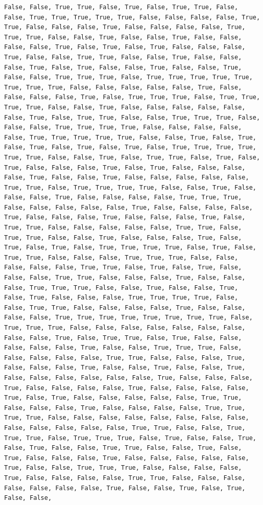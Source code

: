 \documentclass[
  letterpaper,
  DIV=11,
  numbers=noendperiod]{scrartcl}
\begin{document}
\begin{verbatim}
False, False, True, True, False, True, False, True, True, False, False, True, True, True, True, True, False, False, False, False, True, True, False, False, False, True, False, False, False, False, True, True, True, False, False, True, False, False, True, False, False, False, False, True, False, True, False, True, False, False, False, True, False, False, True, True, False, False, True, False, False, False, True, False, True, False, False, True, False, False, True, False, False, True, True, True, False, True, True, True, True, True, True, True, True, False, False, False, False, False, True, False, False, False, False, True, False, True, True, True, False, True, True, True, True, False, False, True, False, False, False, False, False, False, True, False, True, True, False, False, True, True, True, False, False, False, True, True, True, True, False, False, False, False, False, True, True, True, True, True, False, False, True, False, True, False, True, False, True, False, True, False, True, True, True, True, True, True, False, False, True, False, True, True, False, True, False, True, False, False, False, True, False, True, False, False, False, False, True, False, False, True, False, False, False, False, False, True, True, False, True, True, True, True, False, False, True, False, False, False, True, False, False, False, False, True, True, True, False, False, False, False, False, True, False, False, False, False, True, False, False, False, True, False, False, False, True, False, True, True, False, False, False, False, False, True, True, False, True, True, False, False, True, False, False, False, True, False, True, False, True, False, True, True, True, True, False, True, False, True, True, False, False, False, True, True, True, False, False, False, False, False, True, True, False, True, False, True, False, False, False, True, True, False, False, False, True, False, False, False, True, True, True, False, False, True, False, False, True, False, True, False, False, False, True, True, True, True, False, False, True, True, False, False, False, False, True, False, False, False, False, True, True, True, True, True, True, True, True, False, True, True, True, False, False, False, False, False, False, False, False, False, True, False, True, True, False, True, False, False, False, False, False, True, False, False, True, True, True, False, False, False, False, False, True, True, False, False, False, True, False, False, False, True, False, False, True, False, False, True, False, False, False, False, False, False, True, False, False, False, True, False, False, False, False, True, False, False, False, False, True, False, True, False, False, False, False, False, True, True, False, False, False, True, False, False, False, False, True, True, True, True, False, False, False, False, False, False, False, False, False, False, False, False, False, True, True, False, False, True, True, True, False, True, True, True, False, True, False, False, True, False, True, False, False, True, True, False, False, True, False, True, False, False, False, True, False, False, False, False, False, True, False, False, True, True, True, False, False, False, False, True, False, False, False, False, True, True, False, False, False, False, False, False, False, True, False, False, True, False, True, False, False, 
\end{verbatim}
\end{document}
